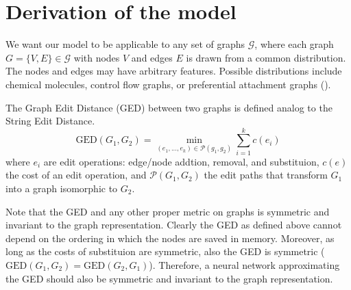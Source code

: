 \section{Derivation of the model}












We want our model to be applicable to any set of graphs $\mathcal{G}$, where each graph $G = \{V, E\} \in \mathcal{G}$ with nodes $V$ and edges $E$ is drawn from a common distribution. The nodes and edges may have arbitrary features. Possible distributions include chemical molecules, control flow graphs, or preferential attachment graphs (\citealp{pref_att2002}).

The Graph Edit Distance (GED) between two graphs is defined analog to the String Edit Distance.
\begin{equation}
     \text{GED}(G_{1},G_{2}) = \min_{(e_{1},...,e_{k}) \in \mathcal{P}(g_{1},g_{2})} \sum_{i=1}^{k} c(e_{i})
\end{equation}
where $e_{i}$ are edit operations: edge/node addtion, removal, and substituion, $c(e)$ the cost of an edit operation, and $\mathcal{P}(G_{1},G_{2})$ the edit paths that transform $G_{1}$ into a graph isomorphic to $G_{2}$.

Note that the GED and any other proper metric on graphs is symmetric and invariant to the graph representation. Clearly the GED as defined above cannot depend on the ordering in which the nodes are saved in memory. Moreover, as long as the costs of substituion are symmetric, also the GED is symmetric ($\text{GED}(G_{1},G_{2}) = \text{GED}(G_{2},G_{1})$). Therefore, a neural network approximating the GED should also be symmetric and invariant to the graph representation.

